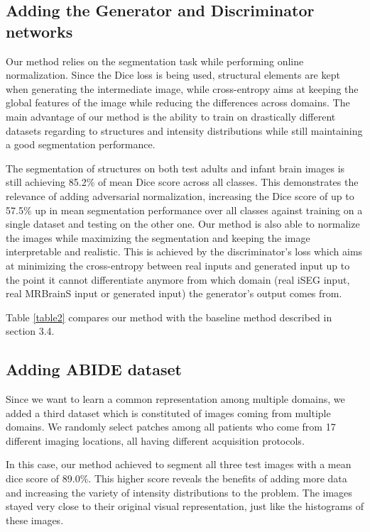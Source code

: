\documentclass[preprint,12pt]{elsarticle}
\begin{document}
\subsection{Adding the Generator and Discriminator networks}
Our method relies on the segmentation task while performing online normalization. Since the Dice loss is being used, structural elements are kept when generating the intermediate image, while cross-entropy aims at keeping the global features of the image while reducing the differences across domains. The main advantage of our method is the ability to train on drastically different datasets regarding to structures and intensity distributions while still maintaining a good segmentation performance.

The segmentation of structures on both test adults and infant brain images is still achieving 85.2\% of mean Dice score across all classes. This demonstrates the relevance of adding adversarial normalization, increasing the Dice score of up to 57.5\% up in mean segmentation performance over all classes against training on a single dataset and testing on the other one. Our method is also able to normalize the images while maximizing the segmentation and keeping the image interpretable and realistic. This is achieved by the discriminator’s loss which aims at minimizing the cross-entropy between real inputs and generated input up to the point it cannot differentiate anymore from which domain (real iSEG input, real MRBrainS input or generated input) the generator’s output comes from.

Table \ref{table2} compares our method with the baseline method described in section 3.4.

\subsection{Adding ABIDE dataset}

Since we want to learn a common representation among multiple domains, we added a third dataset which is constituted of images coming from multiple domains. We randomly select patches among all patients who come from 17 different imaging locations, all having different acquisition protocols.

In this case, our method achieved to segment all three test images with a mean dice score of 89.0\%. This higher score reveals the benefits of adding more data and increasing the variety of intensity distributions to the problem. The images stayed very close to their original visual representation, just like the histograms of these images.
\end{document}
